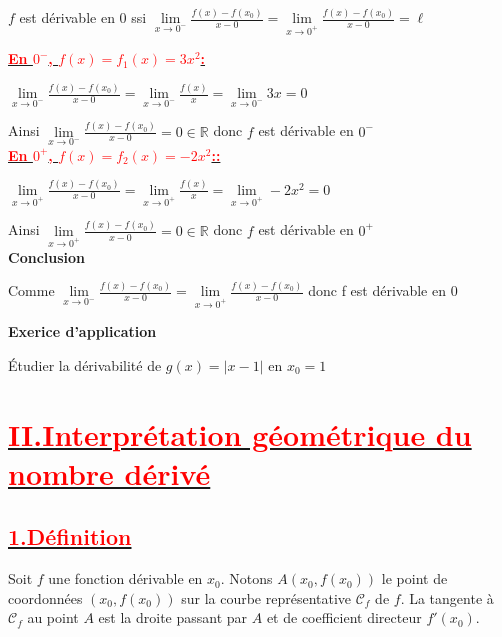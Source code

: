\documentclass[12pt]{article}
\begin{document}
$f$ est dérivable en 0 ssi \( \lim\limits_{x \to 0^{-}}\frac{f(x)-f(x_{0})}{x-0}=\lim\limits_{x \to 0^{+}}\frac{f(x)-f(x_{0})}{x-0}=\ell \)

\underline{\textbf{\textcolor{red}{En $0^{-}$, $f(x)=f_{1}(x)=3x^{2}$:}}}

\( \lim\limits_{x \to 0^{-}}\frac{f(x)-f(x_{0})}{x-0}=\lim\limits_{x \to 0^{-}}\frac{f(x)}{x}=\lim\limits_{x \to 0^{-}}3x=0 \)

Ainsi \( \lim\limits_{x \to 0^{-}}\frac{f(x)-f(x_{0})}{x-0} = 0\in \mathbb{R} \) donc $f$ est dérivable en $0^{-}$\\

\underline{\textbf{\textcolor{red}{En $0^{+}$, $f(x)=f_{2}(x)=-2x^{2}$::}}}

\( \lim\limits_{x \to 0^{+}}\frac{f(x)-f(x_{0})}{x-0}=\lim\limits_{x \to 0^{+}}\frac{f(x)}{x}=\lim\limits_{x \to 0^{+}}-2x^{2}=0 \)

Ainsi \( \lim\limits_{x \to 0^{+}}\frac{f(x)-f(x_{0})}{x-0} = 0\in \mathbb{R} \) donc $f$ est dérivable en $0^{+}$\\

\textbf{Conclusion}

Comme \( \lim\limits_{x \to 0^{-}}\frac{f(x)-f(x_{0})}{x-0} = \lim\limits_{x \to 0^{+}}\frac{f(x)-f(x_{0})}{x-0}  \) donc f est dérivable en 0

\textbf{Exerice d'application}

Étudier la dérivabilité de $g(x)=|x-1|$ en $x_0=1$

\section*{\underline{\textbf{\textcolor{red}{II.Interprétation géométrique du nombre dérivé}}}}
\subsection*{\underline{\textbf{\textcolor{red}{1.Définition}}}}
Soit $f$ une fonction dérivable en $x_0$. Notons $A(x_0, f(x_0))$ le point de coordonnées $(x_0, f(x_0))$ sur la courbe représentative $\mathcal{C}_f$ de $f$. La tangente à $\mathcal{C}_f$ au point $A$ est la droite passant par $A$ et de coefficient directeur $f'(x_0)$.
\end{document}
